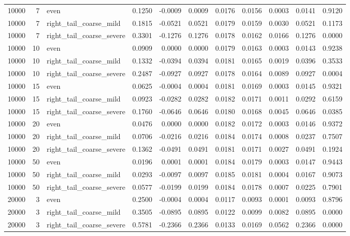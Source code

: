 \begin{table}[!h]
{\begin{tabular}[t]{rrlrrrrrrrr}
10000 & 7 & even & 0.1250 & -0.0009 & 0.0009 & 0.0176 & 0.0156 & 0.0003 & 0.0141 & 0.9120\\
10000 & 7 & right\_tail\_coarse\_mild & 0.1815 & -0.0521 & 0.0521 & 0.0179 & 0.0159 & 0.0030 & 0.0521 & 0.1173\\
10000 & 7 & right\_tail\_coarse\_severe & 0.3301 & -0.1276 & 0.1276 & 0.0178 & 0.0162 & 0.0166 & 0.1276 & 0.0000\\
10000 & 10 & even & 0.0909 & 0.0000 & 0.0000 & 0.0179 & 0.0163 & 0.0003 & 0.0143 & 0.9238\\
10000 & 10 & right\_tail\_coarse\_mild & 0.1332 & -0.0394 & 0.0394 & 0.0181 & 0.0165 & 0.0019 & 0.0396 & 0.3533\\
10000 & 10 & right\_tail\_coarse\_severe & 0.2487 & -0.0927 & 0.0927 & 0.0178 & 0.0164 & 0.0089 & 0.0927 & 0.0004\\
10000 & 15 & even & 0.0625 & -0.0004 & 0.0004 & 0.0181 & 0.0169 & 0.0003 & 0.0145 & 0.9321\\
10000 & 15 & right\_tail\_coarse\_mild & 0.0923 & -0.0282 & 0.0282 & 0.0182 & 0.0171 & 0.0011 & 0.0292 & 0.6159\\
10000 & 15 & right\_tail\_coarse\_severe & 0.1760 & -0.0646 & 0.0646 & 0.0180 & 0.0168 & 0.0045 & 0.0646 & 0.0385\\
10000 & 20 & even & 0.0476 & 0.0000 & 0.0000 & 0.0182 & 0.0172 & 0.0003 & 0.0146 & 0.9372\\
10000 & 20 & right\_tail\_coarse\_mild & 0.0706 & -0.0216 & 0.0216 & 0.0184 & 0.0174 & 0.0008 & 0.0237 & 0.7507\\
10000 & 20 & right\_tail\_coarse\_severe & 0.1362 & -0.0491 & 0.0491 & 0.0181 & 0.0171 & 0.0027 & 0.0491 & 0.1924\\
10000 & 50 & even & 0.0196 & 0.0001 & 0.0001 & 0.0184 & 0.0179 & 0.0003 & 0.0147 & 0.9443\\
10000 & 50 & right\_tail\_coarse\_mild & 0.0293 & -0.0097 & 0.0097 & 0.0185 & 0.0181 & 0.0004 & 0.0167 & 0.9073\\
10000 & 50 & right\_tail\_coarse\_severe & 0.0577 & -0.0199 & 0.0199 & 0.0184 & 0.0178 & 0.0007 & 0.0225 & 0.7901\\
20000 & 3 & even & 0.2500 & -0.0004 & 0.0004 & 0.0117 & 0.0093 & 0.0001 & 0.0093 & 0.8796\\
20000 & 3 & right\_tail\_coarse\_mild & 0.3505 & -0.0895 & 0.0895 & 0.0122 & 0.0099 & 0.0082 & 0.0895 & 0.0000\\
20000 & 3 & right\_tail\_coarse\_severe & 0.5781 & -0.2366 & 0.2366 & 0.0133 & 0.0169 & 0.0562 & 0.2366 & 0.0000\\

\end{tabular}}
\end{table}
